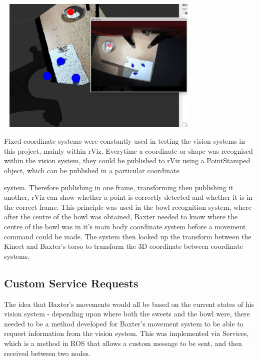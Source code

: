 \begin{minipage}{0.65\textwidth}
\bigskip
\includegraphics[width = 10cm, height = 6.5cm]{sweettransformation.jpg}
\bigskip
\end{minipage}
\hspace{0.5cm}
\begin{minipage}{0.29\textwidth}
\raggedright
Fixed coordinate systems were constantly used in testing the vision systems in this project, mainly within rViz. Everytime a coordinate or shape was recognised within the vision system, they could be published to rViz using a PointStamped object, which can be published in a particular coordinate
\end{minipage}

 system. Therefore publishing in one frame, transforming then publishing it another, rViz can show whether a point is correctly detected and whether it is in the correct frame.
\newline
This principle was used in the bowl recognition system, where after the centre of the bowl was obtained, Baxter needed to know where the centre of the bowl was in it's main body coordinate system before a movement command could be made. The system then looked up the transform between the Kinect and Baxter's torso to transform the 3D coordinate between coordinate systems.
\subsection{Custom Service Requests}
The idea that Baxter's movements would all be based on the current states of his vision system - depending upon where both the sweets and the bowl were, there needed to be a method developed for Baxter's movement system to be able to request information from the vision system. This was implemented via Services, which is a method in ROS that allows a custom message to be sent, and then received between two nodes.

